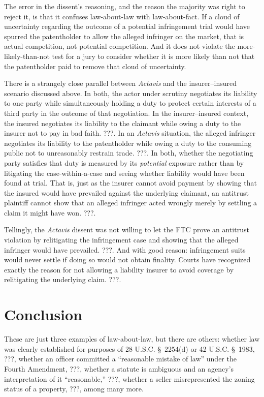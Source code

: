 \documentclass[
  12pt,
  letterpaper,
]{scrartcl}
\begin{document}
The error in the dissent's reasoning, and the reason the majority was right to
reject it, is that it confuses law-about-law with law-about-fact. If a cloud of
uncertainty regarding the outcome of a potential infringement trial would have
spurred the patentholder to allow the alleged infringer on the market, that is
actual competition, not potential competition. And it does not violate the
more-likely-than-not test for a jury to consider whether it is more likely than
not that the patentholder paid to remove that cloud of uncertainty.

There is a strangely close parallel between \textit{Actavis} and the
insurer--insured scenario discussed above. In both, the actor under scrutiny
negotiates its liability to one party while simultaneously holding a duty to
protect certain interests of a third party in the outcome of that negotiation.
In the insurer--insured context, the insured negotiates its liability to the
claimant while owing a duty to the insurer not to pay in bad faith. ???. In an
\emph{Actavis} situation, the alleged infringer negotiates its liability to the
patentholder while owing a duty to the consuming public not to unreasonably
restrain trade. ???. In both, whether the negotiating party satisfies that duty
is measured by its \emph{potential} exposure rather than by litigating the
case-within-a-case and seeing whether liability would have been found at trial.
That is, just as the insurer cannot avoid payment by showing that the insured
would have prevailed against the underlying claimant, an antitrust plaintiff
cannot show that an alleged infringer acted wrongly merely by settling a claim
it might have won. ???.

Tellingly, the \textit{Actavis} dissent was not willing to let the FTC prove an
antitrust violation by relitigating the infringement case and showing that the
alleged infringer would have prevailed. ???. And with good reason: infringement
suits would never settle if doing so would not obtain finality. Courts have
recognized exactly the reason for not allowing a liability insurer to avoid
coverage by relitigating the underlying claim. ???.


\section{Conclusion}

These are just three examples of law-about-law, but there are others:
whether law was clearly established for purposes of 28 U.S.C. § 2254(d) or 42
U.S.C. § 1983, ???, whether an officer committed a ``reasonable mistake of
law'' under the Fourth Amendment, ???, whether a statute is ambiguous and an
agency's interpretation of it ``reasonable,'' ???, whether
a seller misrepresented the zoning status of a property, ???, among many more.
\end{document}
